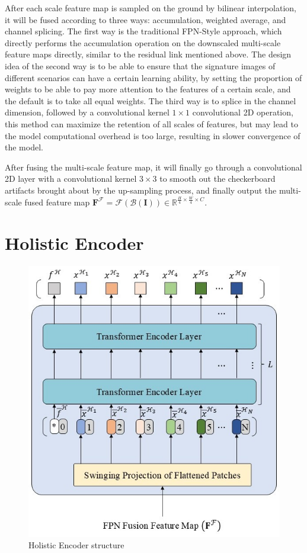 After each scale feature map is sampled on the ground by bilinear interpolation, it will be fused according to three ways: accumulation, weighted average, and channel splicing. The first way is the traditional FPN-Style approach, which directly performs the accumulation operation on the downscaled multi-scale feature maps directly, similar to the residual link mentioned above. The design idea of the second way is to be able to ensure that the signature images of different scenarios can have a certain learning ability, by setting the proportion of weights to be able to pay more attention to the features of a certain scale, and the default is to take all equal weights. The third way is to splice in the channel dimension, followed by a convolutional kernel $1\times 1$ convolutional 2D operation, this method can maximize the retention of all scales of features, but may lead to the model computational overhead is too large, resulting in slower convergence of the model.

After fusing the multi-scale feature map, it will finally go through a convolutional 2D layer with a convolutional kernel $3\times 3$ to smooth out the checkerboard artifacts brought about by the up-sampling process, and finally output the multi-scale fused feature map $\mathbf{F}^\mathcal{F} = \mathcal{F}(\mathcal{B}(\mathbf{I})) \in \mathbb{R}^{\frac{H}{4}\times \frac{W}{4}\times C}$.

\section{Holistic Encoder}

\begin{figure}[H]
  \begin{center}
      \includegraphics[scale=0.6]{figure/encoder.jpg}
  \end{center}
  \caption{Holistic Encoder structure}
  \label{fig:encoder}
\end{figure}

